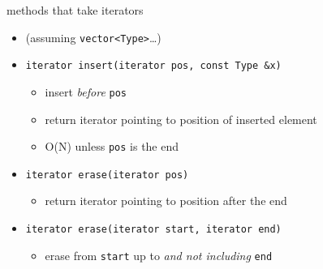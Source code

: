 \begin{frame}[fragile,label=moreItMethods]{methods that take iterators}
\lstset{
    language=C++,
    style=smaller
}
\begin{itemize}
\item (assuming \lstinline|vector<Type>|\ldots)
\item \lstinline|iterator insert(iterator pos, const Type &x)|
\begin{itemize}
    \item insert \textit{before} \texttt{pos}
    \item return iterator pointing to position of inserted element
    \item O(N) unless \texttt{pos} is the end
\end{itemize}
\item \lstinline|iterator erase(iterator pos)| 
    \begin{itemize}
    \item return iterator pointing to position after the end
    \end{itemize}
\item \lstinline|iterator erase(iterator start, iterator end)| 
    \begin{itemize}
        \item erase from \texttt{start} up to \textit{and not including} \texttt{end}
    \end{itemize}
\end{itemize}
\end{frame}

